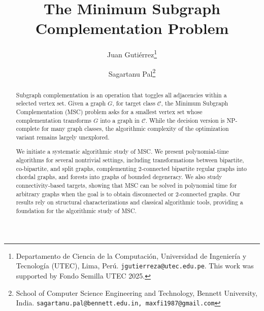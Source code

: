 \documentclass[11pt]{article}
\title{The Minimum Subgraph Complementation Problem}
\author{
Juan Gutiérrez\thanks{Departamento de Ciencia de la Computación,
Universidad de Ingeniería y Tecnología (UTEC), Lima, Perú.
\texttt{jgutierreza@utec.edu.pe}. This work was supported by Fondo Semilla UTEC 2025.}
\and
Sagartanu Pal\thanks{School of Computer Science Engineering and Technology,
Bennett University, India.
\texttt{sagartanu.pal@bennett.edu.in, maxfi1987@gmail.com}}
}
\date{}
\theoremstyle{definition}
\begin{document}
\maketitle

    
\begin{abstract}
Subgraph complementation is an operation that toggles all adjacencies within a selected vertex set. Given a graph $G$, for target class $\mathcal{C}$, the Minimum Subgraph Complementation (MSC) problem asks for a smallest vertex set whose complementation transforms $G$ into a graph in $\mathcal{C}$. While the decision version is NP-complete for many graph classes, the algorithmic complexity of the optimization variant remains largely unexplored.

We initiate a systematic algorithmic study of MSC. We present polynomial-time algorithms for several nontrivial settings, including transformations between bipartite, co-bipartite, and split graphs, complementing 2-connected bipartite regular graphs into chordal graphs, and forests into graphs of bounded degeneracy. We also study connectivity-based targets, showing that MSC can be solved in polynomial time for arbitrary graphs when the goal is to obtain disconnected or 2-connected graphs. Our results rely on structural characterizations and classical algorithmic tools, providing a foundation for the algorithmic study of MSC.
\end{abstract}
\end{document}
